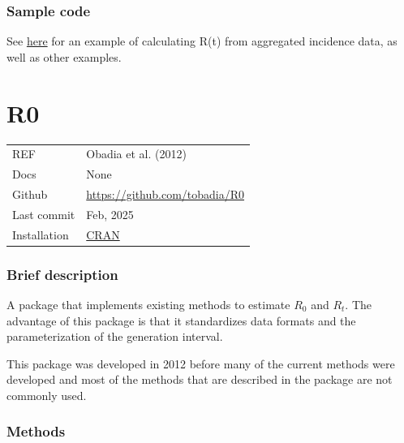 \documentclass[
  letterpaper,
  DIV=11,
  numbers=noendperiod]{scrreprt}
\begin{document}
\subsection*{Sample code}\label{sample-code-9}

See
\href{https://covid-19-re.github.io/estimateR/articles/incidence_data_workflow_example.html}{here}
for an example of calculating R(t) from aggregated incidence data, as
well as other examples.

\chapter*{R0}\label{r0}


\begin{longtable}[]{@{}
  >{\raggedright\arraybackslash}p{}
  >{\raggedright\arraybackslash}p{}@{}}
\toprule\noalign{}
\endhead
\bottomrule\noalign{}
\endlastfoot
REF & Obadia et al. (2012) \\
Docs & None \\
Github & \url{https://github.com/tobadia/R0} \\
Last commit & Feb, 2025 \\
Installation &
\href{https://cran.r-project.org/web/packages/R0/index.html}{CRAN} \\
\end{longtable}

\subsection*{Brief description}\label{brief-description-12}

A package that implements existing methods to estimate \(R_0\) and
\(R_t\). The advantage of this package is that it standardizes data
formats and the parameterization of the generation interval.

This package was developed in 2012 before many of the current methods
were developed and most of the methods that are described in the package
are not commonly used.

\subsection*{Methods}\label{methods-12}
\end{document}
